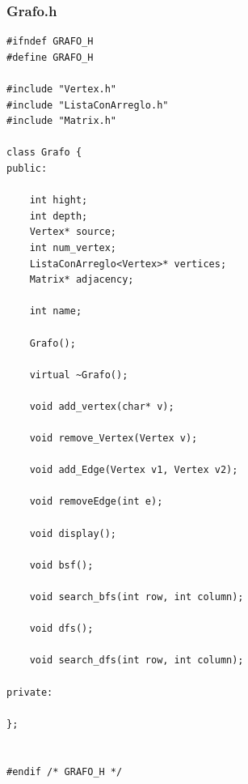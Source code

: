 \documentclass[11pt]{article}
\begin{document}
\subsubsection{Grafo.h}
\lstset {language=C}
\begin{lstlisting}
#ifndef GRAFO_H
#define GRAFO_H

#include "Vertex.h"
#include "ListaConArreglo.h"
#include "Matrix.h"

class Grafo {
public:

    int hight;
    int depth;
    Vertex* source;
    int num_vertex;
    ListaConArreglo<Vertex>* vertices;
    Matrix* adjacency;
    
    int name;

    Grafo();

    virtual ~Grafo();
    
    void add_vertex(char* v);
    
    void remove_Vertex(Vertex v);
    
    void add_Edge(Vertex v1, Vertex v2);
    
    void removeEdge(int e);
    
    void display();
    
    void bsf();
    
    void search_bfs(int row, int column);
    
    void dfs();
    
    void search_dfs(int row, int column);

private:

};


#endif /* GRAFO_H */


\end{lstlisting}
\end{document}
